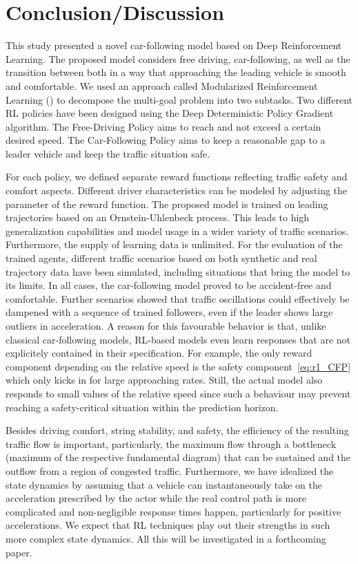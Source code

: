 \documentclass[review]{elsarticle}
\providecommand{\3}{{\ss}}
\begin{document}
	\section{Conclusion/Discussion}
	\label{sec:conclusion}
	This study presented a novel car-following model based on
	Deep Reinforcement Learning. The
	proposed model considers free driving, car-following, as well as the
	transition between both in a way that approaching the leading vehicle
	is smooth and comfortable. We used an approach called Modularized
	Reinforcement Learning (\cite{MRL}) to decompose the multi-goal
	problem into two subtasks. Two different RL policies have been
	designed using the Deep Deterministic Policy Gradient algorithm. The
	Free-Driving Policy aims to reach and not exceed a certain
	desired speed. The Car-Following Policy aims to keep a reasonable gap
	to a leader vehicle and keep the traffic situation safe. 
	
	For each policy, we defined separate reward functions reflecting traffic safety and comfort aspects. 
	Different driver characteristics can be modeled by adjusting the parameter of the reward function.	
	The proposed model is trained on leading trajectories based on an
	Ornstein-Uhlenbeck process. This leads to high generalization capabilities and model usage in a wider variety of traffic scenarios. Furthermore, the
	supply of learning data is unlimited.
	For the evaluation of the trained agents, different traffic scenarios
	based on both synthetic and
	real trajectory data have been simulated, including situations that
	bring the model to its limits. 
	In all cases, the car-following model proved to be accident-free and
	comfortable. Further scenarios showed that traffic oscillations could
	effectively be dampened with a sequence of trained followers, even if
	the leader shows large outliers in acceleration.
    A reason for this favourable behavior is that, unlike
    classical car-following models, RL-based models
    even learn responses that are not explicitely contained in their
    specification. For example, the only reward component depending on
    the relative speed is the safety component~\eqref{eq:r1_CFP}
    which only kicks in for large approaching rates. Still, the
    actual model also responds to small values of the relative
    speed since such a behaviour may prevent reaching a
    safety-critical situation within the prediction horizon.
        	
	Besides driving comfort, string stability, and safety,
	the efficiency of the resulting traffic flow is important,
	particularly, the maximum flow through a
	bottleneck (maximum of the respective fundamental diagram) that can be 
	sustained and the outflow from a region of congested
	traffic. Furthermore, we have idealized the state dynamics by
	assuming that a vehicle can instantaneously take on the acceleration
	prescribed by the actor while the real control path is more
	complicated and non-negligible response times happen, particularly
	for positive accelerations. We expect that RL techniques play out
	their strengths in such more complex state dynamics. All this  will
	be investigated in a forthcoming paper.
	
\end{document}
